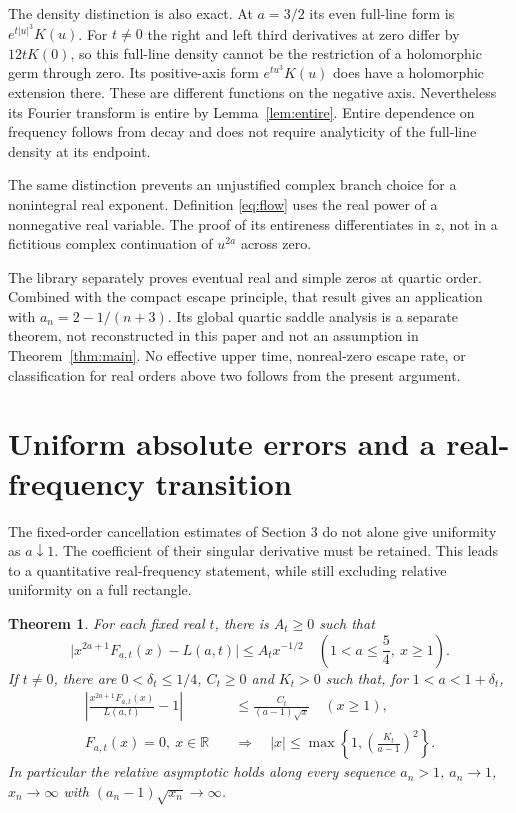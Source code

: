 \documentclass[11pt]{article}
\newtheorem{theorem}{Theorem}[section]
\theoremstyle{remark}\newtheorem{remark}[theorem]{Remark}
\newcommand{\R}{\mathbb R}\newcommand{\C}{\mathbb C}
\begin{document}
The density distinction is also exact. At $a=3/2$ its even full-line
form is $e^{t|u|^3}K(u)$. For $t\neq0$ the right and left third
derivatives at zero differ by $12tK(0)$, so this full-line density
cannot be the restriction of a holomorphic germ through zero.
Its positive-axis form $e^{tu^3}K(u)$ does have a holomorphic
extension there. These are different functions on the negative
axis. Nevertheless its Fourier transform is entire by
Lemma~\ref{lem:entire}. Entire dependence on frequency follows
from decay and does not require analyticity of the full-line density
at its endpoint.

The same distinction prevents an unjustified complex branch choice
for a nonintegral real exponent. Definition \eqref{eq:flow} uses
the real power of a nonnegative real variable. The proof of its
entireness differentiates in $z$, not in a fictitious complex
continuation of $u^{2a}$ across zero.

The library separately proves eventual real and simple zeros at
quartic order. Combined with the compact escape principle, that
result gives an application with $a_n=2-1/(n+3)$. Its global
quartic saddle analysis is a separate theorem, not reconstructed
in this paper and not an assumption in Theorem~\ref{thm:main}.
No effective upper time, nonreal-zero escape rate, or classification
for real orders above two follows from the present argument.



\section{Uniform absolute errors and a real-frequency transition}
The fixed-order cancellation estimates of Section 3 do not alone give
uniformity as $a\downarrow1$. The coefficient of their singular
derivative must be retained. This leads to a quantitative real-frequency
statement, while still excluding relative uniformity on a full rectangle.

\begin{theorem}\label{thm:transition}
For each fixed real $t$, there is $A_t\geq0$ such that
\begin{equation}\label{eq:uniformabsolute}
 \bigl|x^{2a+1}F_{a,t}(x)-L(a,t)\bigr|\leq A_t x^{-1/2}
 \quad\left(1<a\leq\frac54,\ x\geq1\right).
\end{equation}
If $t\ne0$, there are $0<\delta_t\leq1/4$, $C_t\geq0$ and
$K_t>0$ such that, for $1<a<1+\delta_t$,
\begin{align}
 \left|\frac{x^{2a+1}F_{a,t}(x)}{L(a,t)}-1\right|
 &\leq\frac{C_t}{(a-1)\sqrt{x}}\quad(x\geq1),
       \label{eq:uniformrelative}\\
 F_{a,t}(x)=0,\ x\in\R\quad&\Longrightarrow\quad
 |x|\leq\max\left\{1,\left(\frac{K_t}{a-1}\right)^2\right\}.
       \label{eq:realzeroradius}
\end{align}
In particular the relative asymptotic holds along every sequence
$a_n>1$, $a_n\to1$, $x_n\to\infty$ with
$(a_n-1)\sqrt{x_n}\to\infty$.
\end{theorem}
\end{document}
